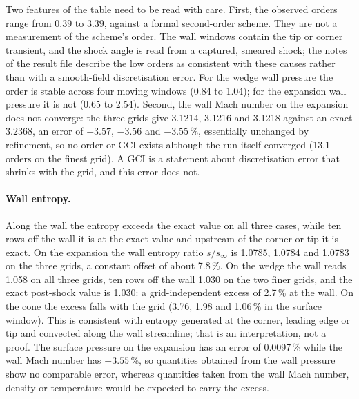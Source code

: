\documentclass[11pt,a4paper]{article}
\begin{document}
Two features of the table need to be read with care.
First, the observed orders range from 0.39 to 3.39, against a formal second-order scheme.
They are not a measurement of the scheme's order.
The wall windows contain the tip or corner transient, and the shock angle is read from a captured, smeared
shock; the notes of the result file describe the low orders as consistent with these causes rather than with a
smooth-field discretisation error.
For the wedge wall pressure the order is stable across four moving windows (0.84 to 1.04); for the expansion wall
pressure it is not (0.65 to 2.54).
Second, the wall Mach number on the expansion does not converge: the three grids give 3.1214, 3.1216 and 3.1218
against an exact 3.2368, an error of $-3.57$, $-3.56$ and $-3.55\,\%$, essentially unchanged by refinement, so no order or GCI
exists although the run itself converged (13.1 orders on the finest grid).
A GCI is a statement about discretisation error that shrinks with the grid, and this error does not.

\paragraph{Wall entropy.}
Along the wall the entropy exceeds the exact value on all three cases, while ten rows off the wall it is at the
exact value and upstream of the corner or tip it is exact.
On the expansion the wall entropy ratio $s/s_\infty$ is 1.0785, 1.0784 and 1.0783 on the three grids, a constant
offset of about 7.8\,\%.
On the wedge the wall reads 1.058 on all three grids, ten rows off the wall 1.030 on the two finer grids, and the exact post-shock
value is 1.030: a grid-independent excess of 2.7\,\% at the wall.
On the cone the excess falls with the grid (3.76, 1.98 and 1.06\,\% in the surface window).
This is consistent with entropy generated at the corner, leading edge or tip and convected along the wall
streamline; that is an interpretation, not a proof.
The surface pressure on the expansion has an error of 0.0097\,\% while the wall Mach number has $-3.55\,\%$, so
quantities obtained from the wall pressure show no comparable error, whereas quantities taken from the wall Mach
number, density or temperature would be expected to carry the excess.
\end{document}

